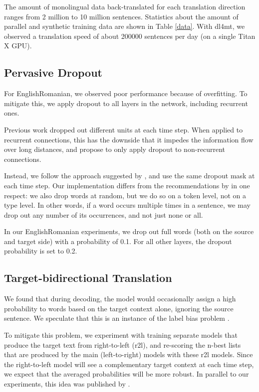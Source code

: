 \documentclass[11pt]{article}
\begin{document}
The amount of monolingual data back-translated for each translation direction ranges from 2 million to 10 million sentences.
Statistics about the amount of parallel and synthetic training data are shown in Table \ref{data}.
With dl4mt, we observed a translation speed of about \num{200000} sentences per day (on a single Titan X GPU).

\subsection{Pervasive Dropout}

For EnglishRomanian, we observed poor performance because of overfitting.
To mitigate this, we apply dropout to all layers in the network, including recurrent ones. 

Previous work dropped out different units at each time step.
When applied to recurrent connections, this has the downside that it impedes the information flow over long distances,
and  propose to only apply dropout to non-recurrent connections.

Instead, we follow the approach suggested by , and use the same dropout mask at each time step.
Our implementation differs from the recommendations by  in one respect: we also drop words at random, but we do so on a token level, not on a type level.
In other words, if a word occurs multiple times in a sentence, we may drop out any number of its occurrences, and not just none or all.

In our EnglishRomanian experiments, we drop out full words (both on the source and target side) with a probability of 0.1.
For all other layers, the dropout probability is set to 0.2.

\subsection{Target-bidirectional Translation}

We found that during decoding, the model would occasionally assign a high probability to words based on the target context alone, ignoring the source sentence.
We speculate that this is an instance of the label bias problem \cite{lafferty2001conditional}.

To mitigate this problem, we experiment with training separate models that produce the target text from right-to-left (r2l),
and re-scoring the n-best lists that are produced by the main (left-to-right) models with these r2l models.
Since the right-to-left model will see a complementary target context at each time step, we expect that the averaged probabilities will be more robust.
In parallel to our experiments, this idea was published by .
\end{document}

